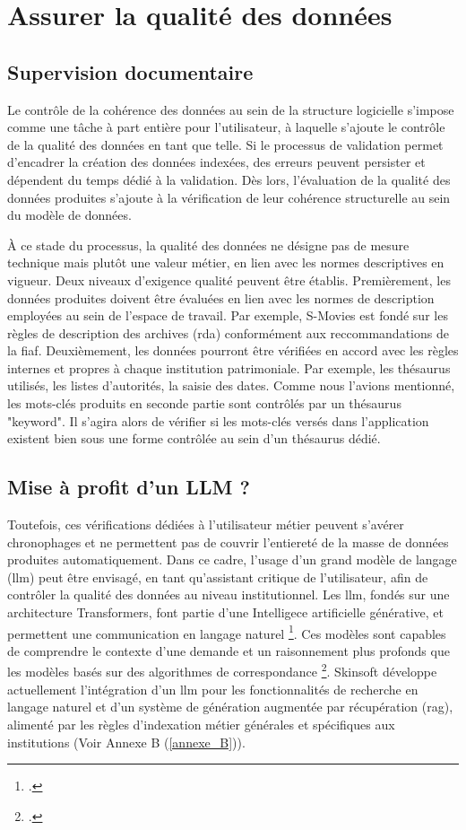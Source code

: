 \section{\label{III_1_B} Assurer la qualité des données}


\subsection{Supervision documentaire}
Le contrôle de la cohérence des données au sein de la structure logicielle s'impose comme une tâche à part entière pour l'utilisateur, à laquelle s'ajoute le contrôle de la qualité des données en tant que telle. Si le processus de validation permet d'encadrer la création des données indexées, des erreurs peuvent persister et dépendent du temps dédié à la validation. Dès lors, l'évaluation de la qualité des données produites s'ajoute à la vérification de leur cohérence structurelle au sein du modèle de données. 

À ce stade du processus, la qualité des données ne désigne pas de mesure technique mais plutôt une valeur métier, en lien avec les normes descriptives en vigueur. Deux niveaux d'exigence qualité peuvent être établis. Premièrement, les données produites doivent être évaluées en lien avec les normes de description employées au sein de l'espace de travail. Par exemple, S-Movies est fondé sur les règles de description des archives (\gls{rda}) conformément aux reccommandations de la \gls{fiaf}. Deuxièmement, les données pourront être vérifiées en accord avec les règles internes et propres à chaque institution patrimoniale. Par exemple, les thésaurus utilisés, les listes d'autorités, la saisie des dates. Comme nous l'avions mentionné, les mots-clés produits en seconde partie sont contrôlés par un thésaurus "keyword". Il s'agira alors de vérifier si les mots-clés versés dans l'application existent bien sous une forme contrôlée au sein d'un thésaurus dédié. 

\subsection{Mise à profit d'un LLM ?}
Toutefois, ces vérifications dédiées à l'utilisateur métier peuvent s'avérer chronophages et ne permettent pas de couvrir l'entiereté de la masse de données produites automatiquement. Dans ce cadre, l'usage d'un grand modèle de langage (\gls{llm}) peut être envisagé, en tant qu'assistant critique de l'utilisateur, afin de contrôler la qualité des données au niveau institutionnel. Les \gls{llm}, fondés sur une architecture \gls{Transformers}, font partie d'une Intelligece artificielle générative, et permettent une communication en langage naturel \footcite{stryker2025a}. Ces modèles sont capables de comprendre le contexte d'une demande et un raisonnement plus profonds que les modèles basés sur des algorithmes de correspondance \footcite{stryker2025a}. Skinsoft développe actuellement l'intégration d'un \gls{llm} pour les fonctionnalités de recherche en langage naturel et d'un système de génération augmentée par récupération (\gls{rag}), alimenté par les règles d'indexation métier générales et spécifiques aux institutions (Voir Annexe B (\ref{annexe_B})). 

